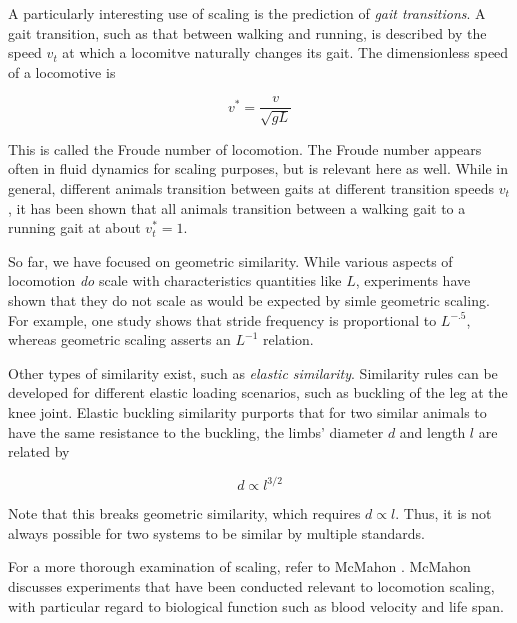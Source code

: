 A particularly interesting use of scaling is the prediction of \textit{gait transitions}. A gait transition, such as that between walking and running, is described by the speed $v_{t}$ at which a locomitve naturally changes its gait. The dimensionless speed of a locomotive is 

\begin{equation}
v^{*} = \frac{v}{\sqrt{gL}}
\end{equation}

This is called the Froude number of locomotion. The Froude number appears often in fluid dynamics for scaling purposes, but is relevant here as well. While in general, different animals transition between gaits at different transition speeds $v_{t}$, it has been shown that all animals transition between a walking gait to a running gait at about $v_{t}^{*} = 1$.

So far, we have focused on geometric similarity. While various aspects of locomotion \emph{do} scale with characteristics quantities like $L$, experiments have shown that they do not scale as would be expected by simle geometric scaling. For example, one study shows that stride frequency is proportional to $L^{-.5}$, whereas geometric scaling asserts an $L^{-1}$ relation.

Other types of similarity exist, such as \emph{elastic similarity}. Similarity rules can be developed for different elastic loading scenarios, such as buckling of the leg at the knee joint. Elastic buckling similarity purports that for two similar animals to have the same resistance to the buckling, the limbs' diameter $d$ and length $l$ are related by

\begin{equation}
d \propto l^{3/2}
\end{equation} 

Note that this breaks geometric similarity, which requires $d \propto l$. Thus, it is not always possible for two systems to be similar by multiple standards.

For a more thorough examination of scaling, refer to McMahon \cite{mcmahon84}. McMahon discusses experiments that have been conducted relevant to locomotion scaling, with particular regard to biological function such as blood velocity and life span.







